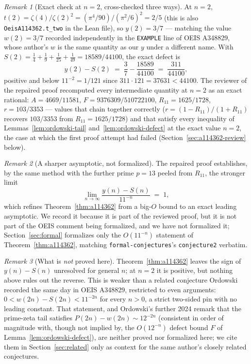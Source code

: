\documentclass[11pt]{article}
\theoremstyle{plain}
\theoremstyle{definition}
\theoremstyle{remark}
\newtheorem*{remark}{Remark}
\numberwithin{equation}{section}
\begin{document}
\begin{remark}[Exact check at $n=2$, cross-checked three ways]
At $n=2$, $t(2) = \zeta(4)/\zeta(2)^2 = (\pi^4/90)/(\pi^2/6)^2 = 2/5$ (this is also
\texttt{OeisA114362.t\_two} in the Lean file), so $y(2) = 3/7$ --- matching the value $w(2)=3/7$
recorded independently in the \texttt{EXAMPLE} line of OEIS A348829, whose author's $w$ is the
same quantity as our $y$ under a different name. With $S(2) = \tfrac14+\tfrac19+\tfrac1{25}+
\tfrac1{49} = 18589/44100$, the exact defect is
\[
  y(2)-S(2) \;=\; \frac37 - \frac{18589}{44100} \;=\; \frac{311}{44100},
\]
positive and below $11^{-2}=1/121$ since $311\cdot121 = 37631 < 44100$. The reviewer of the
repaired proof recomputed every intermediate quantity at $n=2$ as an exact rational:
$A = 4669/11581$, $F = 9376309/510722100$, $R_{11} = 1625/1728$, $r = 103/3353$ --- values that
chain together correctly ($r=(1-R_{11})/(1+R_{11})$ recovers $103/3353$ from $R_{11}=1625/1728$)
and that satisfy every inequality of Lemmas~\ref{lem:ordowski-tail} and~\ref{lem:ordowski-defect}
at the exact value $n=2$, the case at which the first proof attempt had failed
(Section~\ref{sec:a114362-review} below).
\end{remark}

\begin{remark}[A sharper asymptotic, not formalized]
The repaired proof establishes, by the same method with the further prime $p=13$ peeled from
$R_{11}$, the stronger limit
\[
  \lim_{n\to\infty} \frac{y(n)-S(n)}{11^{-n}} \;=\; 1,
\]
which refines Theorem~\ref{thm:a114362} from a big-$O$ bound to an exact leading asymptotic. We
record it because it is part of the reviewed proof, but it is not part of the OEIS comment being
formalized, and we have not formalized it; Section~\ref{sec:formal} formalizes only the
$O(11^{-n})$ statement of Theorem~\ref{thm:a114362}, matching \texttt{formal-conjectures}'s
\texttt{conjecture2} verbatim.
\end{remark}

\begin{remark}[What is \emph{not} proved here]
Theorem~\ref{thm:a114362} leaves the sign of $y(n)-S(n)$ unresolved for general $n$; at $n=2$ it
is positive, but nothing above rules out the reverse. This is weaker than a related conjecture
Ordowski recorded the same day in OEIS A348829, restricted to even arguments:
$0 < w(2n) - S(2n) < 11^{-2n}$ for every $n>0$, a strict two-sided pin with no leading constant.
That statement, and Ordowski's further 2024 remark that the prime-zeta tail satisfies
$P(2n)-w(2n) \sim 12^{-2n}$ (consistent in order of magnitude with, though not implied by, the
$O(12^{-n})$ defect bound $F$ of Lemma~\ref{lem:ordowski-defect}), are neither proved nor
formalized here; we cite them in Section~\ref{sec:related} only as context for the same author's
closely related conjectures.
\end{remark}
\end{document}
